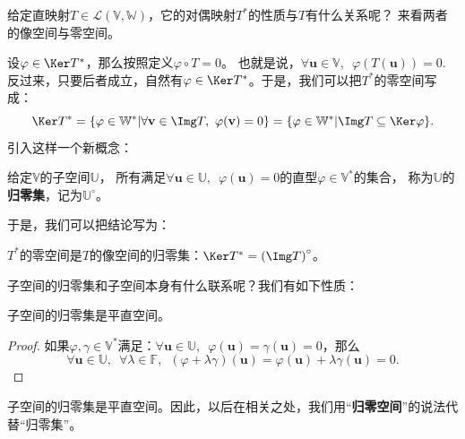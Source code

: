\documentclass[12pt,UTF8]{ctexbook}
\begin{document}
给定直映射$T \in \mathcal{L}(\mathbb{V}, \mathbb{W})$，它的对偶映射$T^*$的性质与$T$有什么关系呢？
来看两者的像空间与零空间。

设$\varphi \in \Ker T^*$，那么按照定义$\varphi \circ T = 0$。
也就是说，$\forall \mathbf{u} \in \mathbb{V}, \,\,\, \varphi(T(\mathbf{u})) = 0.$ 
反过来，只要后者成立，自然有$\varphi \in \Ker T^*$。于是，我们可以把$T^*$的零空间写成：
$$ \Ker T^* = \{\varphi \in \mathbb{W}^* | \forall \mathbf{v} \in \Img T, \,\, \varphi(\mathbf{v}) = 0 \} = \{\varphi \in \mathbb{W}^* |\Img T \subseteq \Ker \varphi \}. $$
引入这样一个新概念：

\begin{df}\label{df:3_3}
给定$\mathbb{V}$的子空间$\mathbb{U}$，
所有满足$\forall \mathbf{u} \in \mathbb{U} , \,\,\, \varphi(\mathbf{u}) = 0$的直型$\varphi  \in \mathbb{V}^*$的集合，
称为$\mathbb{U}$的\textbf{归零集}，记为$\mathbb{U}^\circ$。
\end{df}
于是，我们可以把结论写为：

\begin{pp}\label{pp:3_7}
$T^*$的零空间是$T$的像空间的归零集：$\Ker T^* = \left(\Img T\right)^\circ$。
\end{pp}
子空间的归零集和子空间本身有什么联系呢？我们有如下性质：

\begin{pp}\label{pp:3_8}
子空间的归零集是平直空间。
\end{pp}
\begin{proof} %
如果$\varphi , \gamma  \in \mathbb{V}^*$满足：$\forall \mathbf{u} \in \mathbb{U} , \,\,\, \varphi(\mathbf{u}) = \gamma (\mathbf{u})= 0$，那么
$$ \forall \mathbf{u} \in \mathbb{U} , \,\,\,\forall \lambda \in \mathbb{F}, \,\,\, (\varphi + \lambda \gamma) (\mathbf{u}) = \varphi (\mathbf{u}) + \lambda \gamma(\mathbf{u})  = 0.$$
\end{proof}

子空间的归零集是平直空间。因此，以后在相关之处，我们用“\textbf{归零空间}”的说法代替“归零集”。
\end{document}
